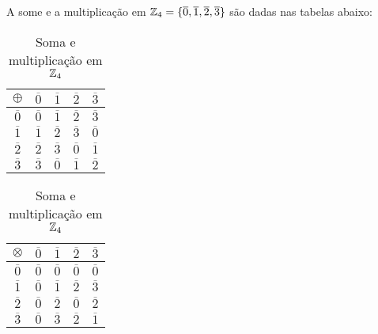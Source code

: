\begin{exemplo}
	A some e a multiplica{\c c}{\~a}o em $\mathbb{Z}_4 = \{\overline{0},\overline{1},\overline{2},\overline{3}\}$
	s\~ao dadas nas tabelas abaixo:
		\begin{table}[!htb]
		  \caption{Soma e multiplica\c{c}\~ao em $\mathbb{Z}_4$}
		  \begin{minipage}{.5\linewidth}
		    \centering
		 	\begin{tabular}{|c|c|c|c|c|} 
			    \hline
			    $\oplus$ & $\overline{0}$ & $\overline{1}$ & $\overline{2}$ & $\overline{3}$\T\\
			    \hline
			    $\overline{0}$ & $\overline{0}$ & $\overline{1}$ & $\overline{2}$ & $\overline{3}$\T\\
			    \hline
			    $\overline{1}$ & $\overline{1}$ & $\overline{2}$ & $\overline{3}$ & $\overline{0}$\T\\
			    \hline
			    $\overline{2}$ & $\overline{2}$ & $\overline{3}$ & $\overline{0}$ & $\overline{1}$\T\\
			    \hline
			    $\overline{3}$ & $\overline{3}$ & $\overline{0}$ & $\overline{1}$ & $\overline{2}$\T\\
			    \hline
			\end{tabular}
		  \end{minipage}
		  \begin{minipage}{.5\linewidth}
		  \centering
		    \begin{tabular}{|c|c|c|c|c|} 
		      \hline
		      $\otimes$ & $\overline{0}$ & $\overline{1}$ & $\overline{2}$ & $\overline{3}$\T\\
		      \hline
		      $\overline{0}$ & $\overline{0}$ & $\overline{0}$ & $\overline{0}$ & $\overline{0}$\T\\
		      \hline
		      $\overline{1}$ & $\overline{0}$ & $\overline{1}$ & $\overline{2}$ & $\overline{3}$\T\\
		      \hline
		      $\overline{2}$ & $\overline{0}$ & $\overline{2}$ & $\overline{0}$ & $\overline{2}$\T\\
		      \hline
		      $\overline{3}$ & $\overline{0}$ & $\overline{3}$ & $\overline{2}$ & $\overline{1}$\T\\
		      \hline
			\end{tabular}
		\end{minipage}
	\end{table}
\end{exemplo}

